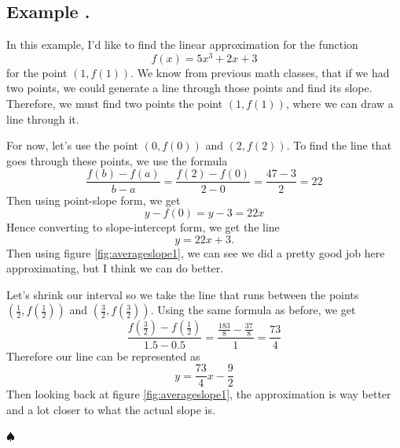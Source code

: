 \documentclass[11pt]{article}
\numberwithin{lemma}{section}
\numberwithin{equation}{section}
\numberwithin{define}{section}
\numberwithin{prop}{section}
\numberwithin{figure}{section}
\numberwithin{thm}{section}
\numberwithin{cor}{section}
\newcounter{ex}[section]
\newenvironment{ex}[0]{

	\refstepcounter{ex}
    \subsection*{Example \theex .}
    }
    {
    \hfill$\spadesuit$
    \par
    }
\numberwithin{ex}{section}
\def\paren#1{\left(#1\right)}
\begin{document}
\begin{ex}
	In this example, I'd like to find the linear approximation for the function
	$$f(x)=5x^3+2x+3$$
	for the point $(1,f(1))$. 
	We know from previous math classes, that if we had two points, we could generate a line through those points and find its slope. Therefore, we must find two points the point $(1,f(1))$, where we can draw a line through it.
	
	For now, let's use the point $(0,f(0))$ and $(2,f(2))$. To find the line that goes through these points, we use the formula
	$$\frac{f(b)-f(a)}{b-a}=\frac{f(2)-f(0)}{2-0}=\frac{47-3}{2}=22$$
	Then using point-slope form, we get 
	$$y-f(0)=y-3=22x$$
	Hence converting to slope-intercept form, we get the line
	$$y=22x+3.$$
	Then using figure \eqref{fig:averageslope1}, we can see we did a pretty good job here approximating, but I think we can do better.
	
	\begin{figure}[h]
	\centering
		\caption{}
		\label{fig:averageslope1}
	\end{figure}
	
	Let's shrink our interval so we take the line that runs between the points $\paren{\frac{1}{2},f\paren{\frac{1}{2}}}$ and $\paren{\frac{3}{2},f\paren{\frac{3}{2}}}$.
	Using the same formula as before, we get
	$$\frac{f\paren{\frac{3}{2}}-f\paren{\frac{1}{2}}}{1.5-0.5}=\frac{\frac{183}{8}-\frac{37}{8}}{1}=\frac{73}{4}$$
	Therefore our line can be represented as
	$$y=\frac{73 }{4}x-\frac{9}{2}$$
	Then looking back at figure \eqref{fig:averageslope1}, the approximation is way better and a lot closer to what the actual slope is.
\end{ex}
\end{document}

